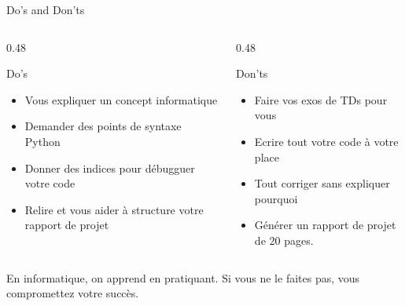 \documentclass{beamer}
\begin{document}
\begin{frame}{Do's and Don'ts}

\begin{columns}[T,onlytextwidth]

    \begin{column}{0.48\textwidth}
        \begin{block}{Do's}
            \begin{itemize}
                \item[$\checkmark$] Vous expliquer un concept informatique
                \item[$\checkmark$] Demander des points de syntaxe Python
                \item[$\checkmark$] Donner des indices pour débugguer votre code
                \item[$\checkmark$] Relire et vous aider à structure votre rapport de projet
            \end{itemize}
        \end{block}
    \end{column}

    \hfill

    \begin{column}{0.48\textwidth}
        \begin{block}{Don'ts}
            \begin{itemize}
                \item[$\times$] Faire vos exos de TDs pour vous
                \item[$\times$] Ecrire tout votre code à votre place
                \item[$\times$]Tout corriger sans expliquer pourquoi
                \item[$\times$] Générer un rapport de projet de 20 pages. 
            \end{itemize}
        \end{block}
    \end{column}

\end{columns}
\pause
\begin{center}
    En informatique, on apprend en pratiquant. Si vous ne le faites pas, vous compromettez votre succès.
\end{center}
\end{frame}
\end{document}
